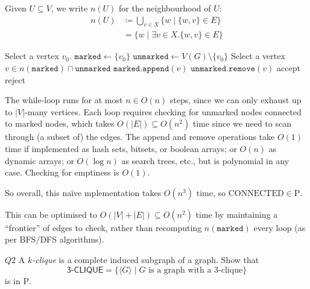 \documentclass{article}
\theoremstyle{definition}
\theoremstyle{definition}
\theoremstyle{remark}
\begin{document}
Given $U\subseteq V$, we write $n(U)$ for the neighbourhood of $U$:
\begin{align*}
    n(U)&\coloneqq\bigcup_{v\in X}\{w\mid\{w,v\}\in E\}\\
    &=\bigl\{w\mid\exists v\in X.\{w,v\}\in E\bigr\}
\end{align*}
\begin{algorithm}[H]
\caption{Decide graph connectivity}
\begin{algorithmic}[1]
    \State Select a vertex $v_0$.
    \State $\mathtt{marked}\gets\{v_0\}$
    \State $\mathtt{unmarked}\gets V(G)\setminus\{v_0\}$
        \State Select a vertex $v\in n(\mathtt{marked})\cap\mathtt{unmarked}$
        \State $\mathtt{marked}.\mathtt{append}(v)$
        \State $\mathtt{unmarked}.\mathtt{remove}(v)$
    \EndWhile
        \State \Return accept
    \Else
        \State \Return reject
    \EndIf
\EndProcedure
\end{algorithmic}
\end{algorithm}

The while-loop runs for at most $n\in O(n)$ steps, since we can only exhaust up to $|V|$-many vertices. Each loop requires checking for unmarked nodes connected to marked nodes, which takes $O(|E|)\subseteq O(n^2)$ time since we need to scan through (a subset of) the edges. The append and remove operations take $O(1)$ time if implemented as hash sets, bitsets, or boolean arrays; or $O(n)$ as dynamic arrays; or $O(\log{n})$ as search trees, etc., but is polynomial in any case. Checking for emptiness is $O(1)$.

So overall, this naïve mplementation takes $O(n^3)$ time, so $\text{CONNECTED}\in\mathrm{P}$.

This can be optimised to $O(|V|+|E|)\subseteq O(n^2)$ time by maintaining a ``frontier'' of edges to check, rather than recomputing $n(\mathtt{marked})$ every loop (as per BFS/DFS algorithms).

\begin{questionbox}{$Q2$}
    A \textit{$k$-clique} is a complete induced subgraph of a graph. Show that
    \begin{equation*}
        \textsf{3-CLIQUE}=\bigl\{\langle G\rangle\mid G\text{ is a graph with a $3$-clique}\bigr\}
    \end{equation*}
    is in $\mathrm{P}$.
\end{questionbox}
\end{document}
